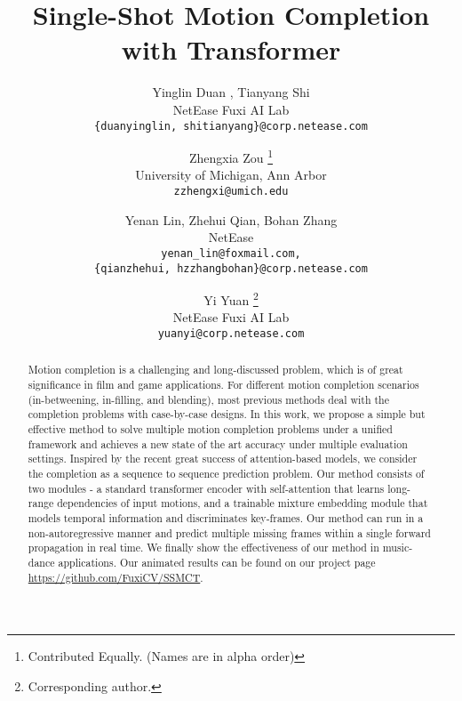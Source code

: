 \documentclass[10pt,twocolumn,letterpaper]{article}
\begin{document}
\title{Single-Shot Motion Completion with Transformer}

\author{Yinglin Duan , Tianyang Shi \\
NetEase Fuxi AI Lab\\
{\tt\small \{duanyinglin, shitianyang\}@corp.netease.com}
\and
Zhengxia Zou \thanks{Contributed Equally. (Names are in alpha order)}\\
University of Michigan, Ann Arbor\\
{\tt\small zzhengxi@umich.edu}
\and
Yenan Lin, Zhehui Qian, Bohan Zhang\\
NetEase \\
{\tt\small yenan\_lin@foxmail.com,}\\
{\tt\small \{qianzhehui, hzzhangbohan\}@corp.netease.com}
\and
Yi Yuan \thanks{Corresponding author.}\\
NetEase Fuxi AI Lab\\
{\tt\small yuanyi@corp.netease.com}
}

\maketitle

\ificcvfinal\thispagestyle{empty}\fi

\begin{abstract}
Motion completion is a challenging and long-discussed problem, which is of great significance in film and game applications. For different motion completion scenarios (in-betweening, in-filling, and blending), most previous methods deal with the completion problems with case-by-case designs. In this work, we propose a simple but effective method to solve multiple motion completion problems under a unified framework and achieves a new state of the art accuracy under multiple evaluation settings. Inspired by the recent great success of attention-based models, we consider the completion as a sequence to sequence prediction problem. Our method consists of two modules - a standard transformer encoder with self-attention that learns long-range dependencies of input motions, and a trainable mixture embedding module that models temporal information and discriminates key-frames. Our method can run in a non-autoregressive manner and predict multiple missing frames within a single forward propagation in real time. We finally show the effectiveness of our method in music-dance applications. Our animated results can be found on our project page \url{https://github.com/FuxiCV/SSMCT}.
\end{abstract}
\end{document}
